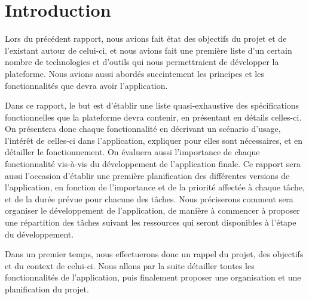 \section{Introduction}
\label{sec:intro}

	Lors du précédent rapport, nous avions fait état des objectifs du projet et de l'existant autour de celui-ci, et nous avions fait une première liste d'un certain nombre de technologies et d'outils qui nous permettraient de développer la plateforme. Nous avions aussi abordés succintement les principes et les fonctionnalités que devra avoir l'application. 

	Dans ce rapport, le but est d'établir une liste quasi-exhaustive des spécifications fonctionnelles que la plateforme devra contenir, en présentant en détails celles-ci. On présentera donc chaque fonctionnalité en décrivant un scénario d'usage, l'intérêt de celles-ci dans l'application, expliquer pour elles sont nécessaires, et en détailler le fonctionnement. On évaluera aussi l'importance de chaque fonctionnalité vis-à-vis du développement de l'application finale. Ce rapport sera aussi l'occasion d'établir une première planification des différentes versions de l'application, en fonction de l'importance et de la priorité affectée à chaque tâche, et de la durée prévue pour chacune des tâches. Nous préciserons comment sera organiser le développement de l'application, de manière à commencer à proposer une répartition des tâches suivant les ressources qui seront disponibles à l'étape du développement.

	Dans un premier temps, nous effectuerons donc un rappel du projet, des objectifs et du context de celui-ci. Nous allons par la suite détailler toutes les fonctionnalités de l'application, puis finalement proposer une organisation et une planification du projet.